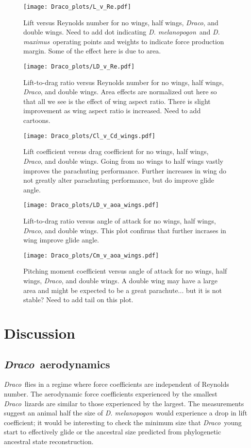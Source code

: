 \documentclass[10pt]{article}
\newcommand{\Draco}{\emph{Draco}}
\newcommand{\Dmelanopogon}{\emph{D. melanopogon}}
\newcommand{\Dmaximus}{\emph{D. maximus}}
\begin{document}
\begin{figure}
\texttt{[image: Draco\_plots/L\_v\_Re.pdf]}
\caption{Lift versus Reynolds number for no wings, half wings, \Draco, and double wings.  Need to add dot indicating \Dmelanopogon\ and \Dmaximus\ operating points and weights to indicate force production margin.  Some of the effect here is due to area. }
\label{fig:L_v_Re}
\end{figure}

\begin{figure}
\texttt{[image: Draco\_plots/LD\_v\_Re.pdf]}
\caption{Lift-to-drag ratio versus Reynolds number for no wings, half wings, \Draco, and double wings.  Area effects are normalized out here so that all we see is the effect of wing aspect ratio.  There is slight improvement as wing aspect ratio is increased.  Need to add cartoons.}
\label{fig:LD_v_Re}
\end{figure}

\begin{figure}
\texttt{[image: Draco\_plots/Cl\_v\_Cd\_wings.pdf]}
\caption{Lift coefficient versus drag coefficient for no wings, half wings, \Draco, and double wings.  Going from no wings to half wings vastly improves the parachuting performance.  Further increases in wing do not greatly alter parachuting performance, but do improve glide angle. }
\label{fig:Cl_v_Cd_wings}
\end{figure}

\begin{figure}
\texttt{[image: Draco\_plots/LD\_v\_aoa\_wings.pdf]}
\caption{Lift-to-drag ratio versus angle of attack for no wings, half wings, \Draco, and double wings.  This plot confirms that further incrases in wing improve glide angle.}
\label{fig:LD_v_aoa_wings}
\end{figure}

\begin{figure}
\texttt{[image: Draco\_plots/Cm\_v\_aoa\_wings.pdf]}
\caption{Pitching moment coefficient versus angle of attack for no wings, half wings, \Draco, and double wings.  A double wing may have a large area and might be expected to be a great parachute... but it is not stable?  Need to add tail on this plot.}
\label{fig:Cm_v_aoa_wings}
\end{figure}

\section{Discussion}

\subsection{\Draco\ aerodynamics}
\Draco\ flies in a regime where force coefficients are independent of Reynolds number. The aerodynamic force coefficients experienced by the smallest \Draco\ lizards are similar to those experienced by the largest. The measurements suggest an animal half the size of \Dmelanopogon\ would experience a drop in lift coefficient; it would be interesting to check the minimum size that \Draco\ young start to effectively glide or the ancestral size predicted from phylogenetic ancestral state reconstruction. 
\end{document}
